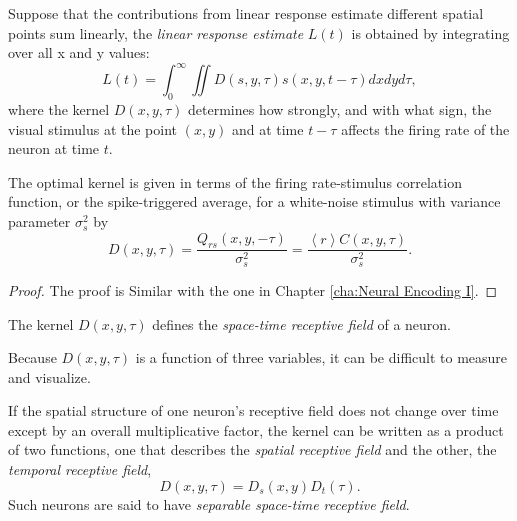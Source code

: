 \begin{defn}
  \label{def:linearResponseEstimate}
  Suppose that the contributions from linear response estimate different spatial points sum linearly, the \emph{linear response estimate} $L(t)$ is obtained by integrating over all x and y values:
  \begin{equation}
    \label{equ:2.24}
    L(t) = \int_0^{\infty}\iint D(s,y,\tau)s(x,y,t-\tau)dxdyd\tau,
  \end{equation}
  where the kernel $D(x,y,\tau)$ determines how strongly, and with what sign, the visual stimulus at the point $(x,y)$ and at time $t-\tau$ affects the firing rate of the neuron at time $t$.
\end{defn}

\begin{prop}
  The optimal kernel is given in terms of the firing rate-stimulus correlation function, or the spike-triggered average, for a white-noise stimulus with variance parameter $\sigma_s^2$ by
  \begin{equation}
    \label{equ:2.25}
    D(x,y,\tau) = \frac{Q_{rs}(x,y,-\tau)}{\sigma_s^2} = \frac{\left<r\right>C(x,y,\tau)}{\sigma_s^2}.
  \end{equation}
\end{prop}
\begin{proof}
  The proof is Similar with the one in Chapter \ref{cha:Neural Encoding I}.
\end{proof}

\begin{defn}
  \label{def:space-timeReceptiveField}
  The kernel $D(x,y,\tau)$ defines the \emph{space-time receptive field} of a neuron.
\end{defn}

\begin{rem}
  Because $D(x,y,\tau)$ is a function of three variables, it can be difficult to measure and visualize.
\end{rem}

\begin{defn}
  \label{def:separableReceptiveField}
  If the spatial structure of one neuron's receptive field does not change over time except by an overall multiplicative factor, the kernel can be written as a product of two functions, one that describes the \emph{spatial receptive field} and the other, the \emph{temporal receptive field},
  \begin{equation}
    \label{equ:2.26}
    D(x,y,\tau) = D_s(x,y)D_t(\tau).
  \end{equation}
  Such neurons are said to have \emph{separable space-time receptive field}.
\end{defn}

